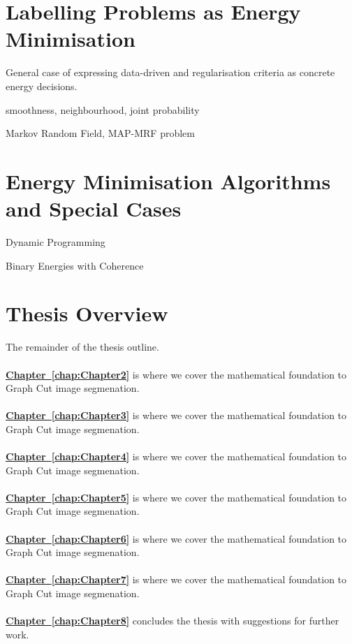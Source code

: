 \section{Labelling Problems as Energy Minimisation}

General case of expressing data-driven and regularisation criteria as concrete energy decisions.

smoothness, neighbourhood, joint probability

Markov Random Field, MAP-MRF problem


\section{Energy Minimisation Algorithms and Special Cases}\label{FillingFile}

Dynamic Programming 

Binary Energies with Coherence


\section{Thesis Overview}

The remainder of the thesis outline.\\
\\
\textbf{\hyperref[chap:Chapter2]{Chapter~\ref*{chap:Chapter2}}} is where we cover the mathematical foundation to Graph Cut image segmenation.\\
\\
\textbf{\hyperref[chap:Chapter3]{Chapter~\ref*{chap:Chapter3}}} is where we cover the mathematical foundation to Graph Cut image segmenation.\\
\\
\textbf{\hyperref[chap:Chapter4]{Chapter~\ref*{chap:Chapter4}}} is where we cover the mathematical foundation to Graph Cut image segmenation.\\
\\
\textbf{\hyperref[chap:Chapter5]{Chapter~\ref*{chap:Chapter5}}} is where we cover the mathematical foundation to Graph Cut image segmenation.\\
\\
\textbf{\hyperref[chap:Chapter6]{Chapter~\ref*{chap:Chapter6}}} is where we cover the mathematical foundation to Graph Cut image segmenation.\\
\\
\textbf{\hyperref[chap:Chapter7]{Chapter~\ref*{chap:Chapter7}}} is where we cover the mathematical foundation to Graph Cut image segmenation.\\
\\
\textbf{\hyperref[chap:Chapter8]{Chapter~\ref*{chap:Chapter8}}} concludes the thesis with suggestions for further work.
